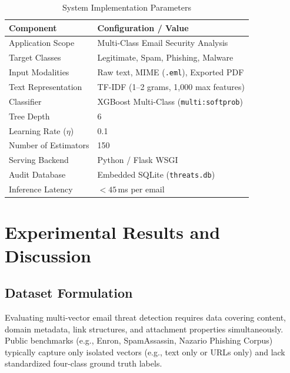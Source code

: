 \documentclass[conference]{IEEEtran}
\begin{document}
\begin{table}[htbp]
\caption{System Implementation Parameters}
\label{tab:sys_params}
\centering
\begin{tabular}{ll}
\toprule
\textbf{Component} & \textbf{Configuration / Value} \\
\midrule
Application Scope & Multi-Class Email Security Analysis \\
Target Classes & Legitimate, Spam, Phishing, Malware \\
Input Modalities & Raw text, MIME (\texttt{.eml}), Exported PDF \\
Text Representation & TF-IDF (1--2 grams, 1,000 max features) \\
Classifier & XGBoost Multi-Class (\texttt{multi:softprob}) \\
Tree Depth & 6 \\
Learning Rate ($\eta$) & 0.1 \\
Number of Estimators & 150 \\
Serving Backend & Python / Flask WSGI \\
Audit Database & Embedded SQLite (\texttt{threats.db}) \\
Inference Latency & $< 45$\,ms per email \\
\bottomrule
\end{tabular}
\end{table}

\section{Experimental Results and Discussion}
\label{sec:results}

\subsection{Dataset Formulation}
Evaluating multi-vector email threat detection requires data covering content, domain metadata, link structures, and attachment properties simultaneously. Public benchmarks (e.g., Enron, SpamAssassin, Nazario Phishing Corpus) typically capture only isolated vectors (e.g., text only or URLs only) and lack standardized four-class ground truth labels. 
\end{document}
